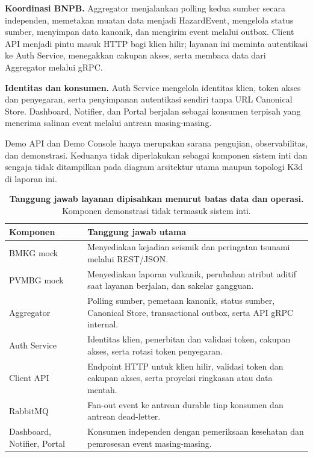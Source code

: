 \documentclass{fairmeta}
\begin{document}
\textbf{Koordinasi BNPB.} Aggregator menjalankan polling kedua sumber secara independen, memetakan muatan data menjadi HazardEvent, mengelola status sumber, menyimpan data kanonik, dan mengirim event melalui outbox. Client API menjadi pintu masuk HTTP bagi klien hilir; layanan ini meminta autentikasi ke Auth Service, menegakkan cakupan akses, serta membaca data dari Aggregator melalui gRPC.

\textbf{Identitas dan konsumen.} Auth Service mengelola identitas klien, token akses dan penyegaran, serta penyimpanan autentikasi sendiri tanpa URL Canonical Store. Dashboard, Notifier, dan Portal berjalan sebagai konsumen terpisah yang menerima salinan event melalui antrean masing-masing.

Demo API dan Demo Console hanya merupakan sarana pengujian, observabilitas, dan demonstrasi. Keduanya tidak diperlakukan sebagai komponen sistem inti dan sengaja tidak ditampilkan pada diagram arsitektur utama maupun topologi K3d di laporan ini.

\begin{table}[htbp]
\centering
\caption{\textbf{Tanggung jawab layanan dipisahkan menurut batas data dan operasi.} Komponen demonstrasi tidak termasuk sistem inti.}
\label{tab:components}
\footnotesize
\begin{tabularx}{\textwidth}{@{}L{3.15cm}Y@{}}
\toprule
\textbf{Komponen} & \textbf{Tanggung jawab utama}\\
\midrule
BMKG mock & Menyediakan kejadian seismik dan peringatan tsunami melalui REST/JSON.\\
PVMBG mock & Menyediakan laporan vulkanik, perubahan atribut aditif saat layanan berjalan, dan sakelar gangguan.\\
\addlinespace[2pt]
Aggregator & Polling sumber, pemetaan kanonik, status sumber, Canonical Store, transactional outbox, serta API gRPC internal.\\
Auth Service & Identitas klien, penerbitan dan validasi token, cakupan akses, serta rotasi token penyegaran.\\
Client API & Endpoint HTTP untuk klien hilir, validasi token dan cakupan akses, serta proyeksi ringkasan atau data mentah.\\
\addlinespace[2pt]
RabbitMQ & Fan-out event ke antrean durable tiap konsumen dan antrean dead-letter.\\
Dashboard, Notifier, Portal & Konsumen independen dengan pemeriksaan kesehatan dan pemrosesan event masing-masing.\\
\bottomrule
\end{tabularx}
\end{table}
\end{document}

